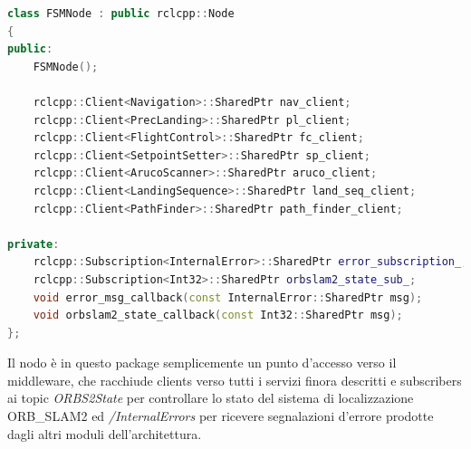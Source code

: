 \begin{lstlisting}[language=C++, caption={Definizione del nodo \emph{fsm}.}, label={lst:fsmnode}]
class FSMNode : public rclcpp::Node
{
public:
    FSMNode();

    rclcpp::Client<Navigation>::SharedPtr nav_client;
    rclcpp::Client<PrecLanding>::SharedPtr pl_client;
    rclcpp::Client<FlightControl>::SharedPtr fc_client;
    rclcpp::Client<SetpointSetter>::SharedPtr sp_client;
    rclcpp::Client<ArucoScanner>::SharedPtr aruco_client;
    rclcpp::Client<LandingSequence>::SharedPtr land_seq_client;
    rclcpp::Client<PathFinder>::SharedPtr path_finder_client;

private:
    rclcpp::Subscription<InternalError>::SharedPtr error_subscription_;
    rclcpp::Subscription<Int32>::SharedPtr orbslam2_state_sub_;
    void error_msg_callback(const InternalError::SharedPtr msg);
    void orbslam2_state_callback(const Int32::SharedPtr msg);
};
\end{lstlisting}
Il nodo è in questo package semplicemente un punto d'accesso verso il middleware, che racchiude clients verso tutti i servizi finora descritti e subscribers ai topic \emph{ORBS2State} per controllare lo stato del sistema di localizzazione ORB\_SLAM2 ed \emph{/InternalErrors} per ricevere segnalazioni d'errore prodotte dagli altri moduli dell'architettura.

